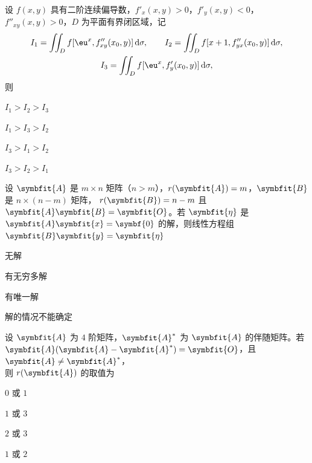 \begin{question}[index=4]
设 $f(x,y)$ 具有二阶连续偏导数，$f'_x(x,y)>0$，$f'_y(x,y)<0$，$f''_{xy}(x,y)>0$，$D$ 为平面有界闭区域，记
\[
\begin{gathered}
I_1=\iint_D f[\eu^x,f''_{xy}(x_0,y)]\dd\sigma,\qquad
I_2=\iint_D f[x+1,f''_{yx}(x_0,y)]\dd\sigma,\\
I_3=\iint_D f[\eu^x,f'_y(x_0,y)]\dd\sigma,
\end{gathered}
\]
则\paren
\begin{choices}[columns=4]
\item $I_1>I_2>I_3$
\item $I_1>I_3>I_2$
\item $I_3>I_1>I_2$
\item $I_3>I_2>I_1$
\end{choices}
\end{question}

\begin{question}[index=5]
设 $\symbfit{A}$ 是 $m\times n$ 矩阵（$n>m$），$r(\symbfit{A})=m$，$\symbfit{B}$ 是 $n\times(n-m)$ 矩阵，
$r(\symbfit{B})=n-m$ 且 $\symbfit{A}\symbfit{B}=\symbfit{O}$。若 $\symbfit{\eta}$ 是
$\symbfit{A}\symbfit{x}=\symbf{0}$ 的解，则线性方程组 $\symbfit{B}\symbfit{y}=\symbfit{\eta}$\paren
\begin{choices}[columns=2]
\item 无解
\item 有无穷多解
\item 有唯一解
\item 解的情况不能确定
\end{choices}
\end{question}

\begin{question}[index=6]
设 $\symbfit{A}$ 为 $4$ 阶矩阵，$\symbfit{A}^*$ 为 $\symbfit{A}$ 的伴随矩阵。若
$\symbfit{A}(\symbfit{A}-\symbfit{A}^*)=\symbfit{O}$，且 $\symbfit{A}\ne\symbfit{A}^*$，\\
则 $r(\symbfit{A})$ 的取值为\paren
\begin{choices}[columns=4]
\item $0$ 或 $1$
\item $1$ 或 $3$
\item $2$ 或 $3$
\item $1$ 或 $2$
\end{choices}
\end{question}

